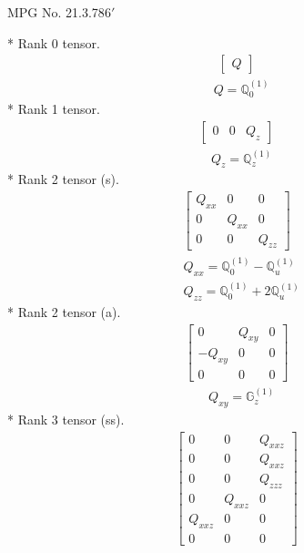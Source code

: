 \documentclass[fleqn,8pt,landscape]{jsarticle}
\begin{document}
\setcounter{MaxMatrixCols}{32}

\renewcommand{\tablename}{Table~}
\renewcommand{\figurename}{Figure~}
\begin{center}
\LARGE
MPG No. 21.3.78\quad$6'$
\end{center}
* Rank 0 tensor.
\begin{align*}
\begin{bmatrix} Q \end{bmatrix}
\end{align*}
\begin{align*}
& Q = \mathbb{Q}_{0}^{(1)}
\end{align*}
* Rank 1 tensor.
\begin{align*}
\begin{bmatrix} 0 & 0 & Q_{z} \end{bmatrix}
\end{align*}
\begin{align*}
& Q_{z} = \mathbb{Q}_{z}^{(1)}
\end{align*}
* Rank 2 tensor (s).
\begin{align*}
\begin{bmatrix} Q_{xx} & 0 & 0 \\ 0 & Q_{xx} & 0 \\ 0 & 0 & Q_{zz} \end{bmatrix}
\end{align*}
\begin{align*}
& Q_{xx} = \mathbb{Q}_{0}^{(1)} - \mathbb{Q}_{u}^{(1)} \\
& Q_{zz} = \mathbb{Q}_{0}^{(1)} + 2 \mathbb{Q}_{u}^{(1)}
\end{align*}
* Rank 2 tensor (a).
\begin{align*}
\begin{bmatrix} 0 & Q_{xy} & 0 \\ - Q_{xy} & 0 & 0 \\ 0 & 0 & 0 \end{bmatrix}
\end{align*}
\begin{align*}
& Q_{xy} = \mathbb{G}_{z}^{(1)}
\end{align*}
* Rank 3 tensor (ss).
\begin{align*}
\begin{bmatrix} 0 & 0 & Q_{xxz} \\ 0 & 0 & Q_{xxz} \\ 0 & 0 & Q_{zzz} \\ 0 & Q_{xxz} & 0 \\ Q_{xxz} & 0 & 0 \\ 0 & 0 & 0 \end{bmatrix}
\end{align*}
\end{document}

